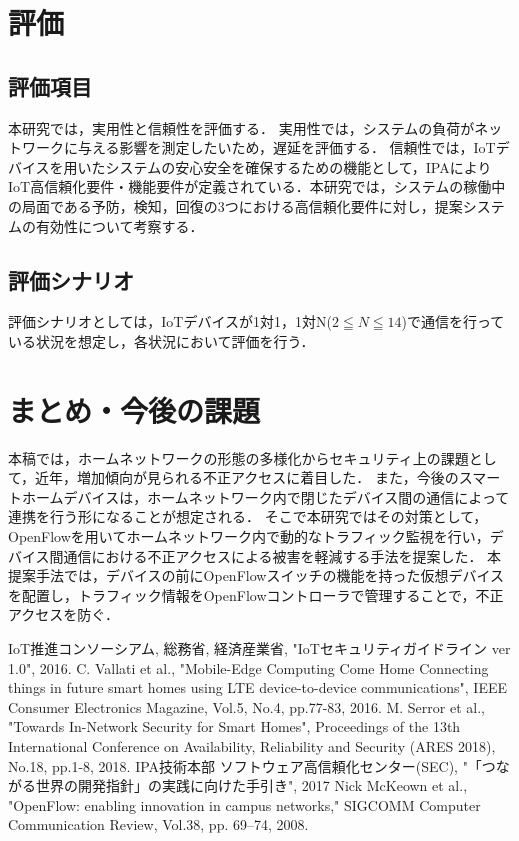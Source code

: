 \documentclass[a4paper,10pt,twocolumn,uplatex]{jsarticle}
\begin{document}
\section{評価}
\subsection{評価項目}
本研究では，実用性と信頼性を評価する．
実用性では，システムの負荷がネットワークに与える影響を測定したいため，遅延を評価する．
信頼性では，IoTデバイスを用いたシステムの安心安全を確保するための機能として，IPAによりIoT高信頼化要件・機能要件が定義されている\cite{IPA}．本研究では，システムの稼働中の局面である予防，検知，回復の3つにおける高信頼化要件に対し，提案システムの有効性について考察する．


\subsection{評価シナリオ}
評価シナリオとしては，IoTデバイスが1対1，1対N($2\leqq N \leqq 14$)で通信を行っている状況を想定し，各状況において評価を行う．

\section{まとめ・今後の課題}
本稿では，ホームネットワークの形態の多様化からセキュリティ上の課題として，近年，増加傾向が見られる不正アクセスに着目した．
また，今後のスマートホームデバイスは，ホームネットワーク内で閉じたデバイス間の通信によって連携を行う形になることが想定される．
そこで本研究ではその対策として，OpenFlowを用いてホームネットワーク内で動的なトラフィック監視を行い，デバイス間通信における不正アクセスによる被害を軽減する手法を提案した．
本提案手法では，デバイスの前にOpenFlowスイッチの機能を持った仮想デバイスを配置し，トラフィック情報をOpenFlowコントローラで管理することで，不正アクセスを防ぐ．

\footnotesize{
  \begin{thebibliography}{99}
     IoT推進コンソーシアム, 総務省, 経済産業省, "IoTセキュリティガイドライン ver 1.0", 2016.
     C. Vallati et al., "Mobile-Edge Computing Come Home Connecting things in future smart homes using LTE device-to-device communications", IEEE Consumer Electronics Magazine, Vol.5, No.4, pp.77-83, 2016.
     M. Serror et al., "Towards In-Network Security for Smart Homes", Proceedings of the 13th International Conference on Availability, Reliability and Security (ARES 2018), No.18, pp.1-8, 2018.
     IPA技術本部 ソフトウェア高信頼化センター(SEC), "「つながる世界の開発指針」の実践に向けた手引き", 2017
     Nick McKeown et al., "OpenFlow: enabling innovation in campus networks," SIGCOMM Computer Communication Review, Vol.38, pp. 69–74, 2008.
  \end{thebibliography}
}

\end{document}
